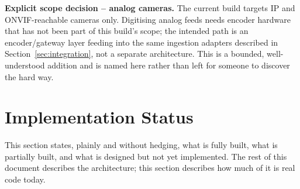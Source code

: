 \documentclass[11pt,a4paper]{article}
\begin{document}
\textbf{Explicit scope decision -- analog cameras.} The current build
targets IP and ONVIF-reachable cameras only. Digitising analog feeds needs
encoder hardware that has not been part of this build's scope; the
intended path is an encoder/gateway layer feeding into the same ingestion
adapters described in Section~\ref{sec:integration}, not a separate
architecture. This is a bounded, well-understood addition and is named
here rather than left for someone to discover the hard way.

\section{Implementation Status}
\label{sec:status}

This section states, plainly and without hedging, what is fully built,
what is partially built, and what is designed but not yet implemented.
The rest of this document describes the architecture; this section
describes how much of it is real code today.
\end{document}

